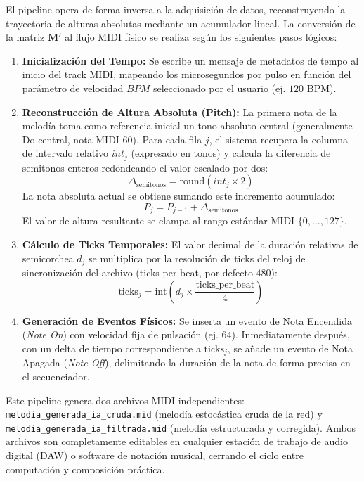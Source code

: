 \documentclass[12pt]{report}
\begin{document}
El pipeline opera de forma inversa a la adquisición de datos, reconstruyendo la trayectoria de alturas absolutas mediante un acumulador lineal. La conversión de la matriz $\mathbf{M}'$ al flujo MIDI físico se realiza según los siguientes pasos lógicos:
\begin{enumerate}
    \item \textbf{Inicialización del Tempo:} Se escribe un mensaje de metadatos de tempo al inicio del track MIDI, mapeando los microsegundos por pulso en función del parámetro de velocidad $BPM$ seleccionado por el usuario (ej. $120$ BPM).
    \item \textbf{Reconstrucción de Altura Absoluta (Pitch):} La primera nota de la melodía toma como referencia inicial un tono absoluto central (generalmente Do central, nota MIDI $60$). Para cada fila $j$, el sistema recupera la columna de intervalo relativo $int_j$ (expresado en tonos) y calcula la diferencia de semitonos enteros redondeando el valor escalado por dos:
    \begin{equation}
        \Delta_{\text{semitonos}} = \text{round}(int_j \times 2)
    \end{equation}
    La nota absoluta actual se obtiene sumando este incremento acumulado:
    \begin{equation}
        P_j = P_{j-1} + \Delta_{\text{semitonos}}
    \end{equation}
    El valor de altura resultante se clampa al rango estándar MIDI $\{0, \dots, 127\}$.
    
    \item \textbf{Cálculo de Ticks Temporales:} El valor decimal de la duración relativas de semicorchea $d_j$ se multiplica por la resolución de ticks del reloj de sincronización del archivo (ticks per beat, por defecto $480$):
    \begin{equation}
        \text{ticks}_j = \text{int}\left( d_j \times \frac{\text{ticks\_per\_beat}}{4} \right)
    \end{equation}
    
    \item \textbf{Generación de Eventos Físicos:} Se inserta un evento de Nota Encendida (\textit{Note On}) con velocidad fija de pulsación (ej. $64$). Inmediatamente después, con un delta de tiempo correspondiente a $\text{ticks}_j$, se añade un evento de Nota Apagada (\textit{Note Off}), delimitando la duración de la nota de forma precisa en el secuenciador.
\end{enumerate}

Este pipeline genera dos archivos MIDI independientes: \texttt{melodia\_generada\_ia\_cruda.mid} (melodía estocástica cruda de la red) y \texttt{melodia\_generada\_ia\_filtrada.mid} (melodía estructurada y corregida). Ambos archivos son completamente editables en cualquier estación de trabajo de audio digital (DAW) o software de notación musical, cerrando el ciclo entre computación y composición práctica.





\end{document}
